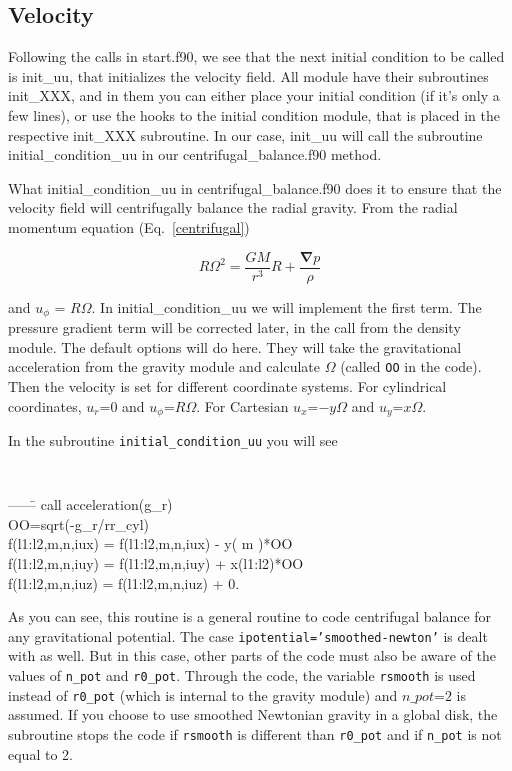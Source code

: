 \documentclass[a4paper,10pt]{article}
\renewcommand{\v}[1]{{\boldsymbol #1}} %
\newcommand{\del}{\v{\nabla}}
\newcommand{\grad}{\del}
\begin{document}
\subsection{Velocity}

Following the calls in start.f90, we see that the next initial
condition to be called is init\_uu, that initializes the velocity
field. All module have their subroutines init\_XXX, and in them you
can either place your initial condition (if it's only a few lines), or
use the hooks to the initial condition module, that is placed in the
respective init\_XXX subroutine. In our case, init\_uu will call the
subroutine initial\_condition\_uu in our centrifugal\_balance.f90
method. 

What  initial\_condition\_uu in  centrifugal\_balance.f90 does it to ensure that the velocity field will centrifugally balance the radial gravity. From the radial momentum equation (Eq.~\ref{centrifugal})

\begin{equation}
R\Omega^2 = \frac{GM}{r^3}R + \frac{\grad{p}}{\rho}
\end{equation}

\noindent and $u_\phi$ = $R\Omega$. In initial\_condition\_uu we
will implement the first term. The pressure gradient term will be
corrected later, in the call from the density module. The default
options will do here. They will take the gravitational acceleration from the gravity module and calculate $\Omega$ (called {\tt OO} in the code). Then the velocity is set for different coordinate systems. For cylindrical coordinates, $u_r$=0 and $u_\phi$=$R\Omega$. For Cartesian $u_x$=$-y\Omega$ and $u_y$=$x\Omega$.

In the subroutine {\tt initial\_condition\_uu} you will see

{\tt 
\begin{tabbing}
  ------\=\kill
        \>  call acceleration(g\_r)\\

        \>  OO=sqrt(-g\_r/rr\_cyl)\\
        \>  f(l1:l2,m,n,iux) = f(l1:l2,m,n,iux) - y(  m  )*OO\\
        \>  f(l1:l2,m,n,iuy) = f(l1:l2,m,n,iuy) + x(l1:l2)*OO\\
        \>  f(l1:l2,m,n,iuz) = f(l1:l2,m,n,iuz) + 0.\\
\end{tabbing}
}

As you can see, this routine is a general routine to code centrifugal balance for any gravitational potential. The case {\tt ipotential='smoothed-newton'} is dealt with as well. But in this case, other parts of the code must also be aware of the values of {\tt n\_pot} and {\tt r0\_pot}. Through the code, the variable {\tt rsmooth} is used instead of {\tt r0\_pot} (which is internal to the gravity module) and $n\_pot$=$2$ is assumed. If you choose to use smoothed Newtonian gravity in a global disk, the subroutine stops the code if {\tt rsmooth} is different than {\tt r0\_pot} and if {\tt n\_pot} is not equal to 2. 
\end{document}

